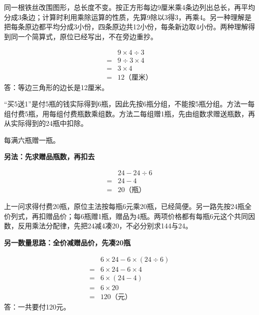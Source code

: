 \documentclass[multi=snippet,border=0pt]{standalone}
\newenvironment{snippet}[3]{\begin{minipage}{#1bp}\color{answerred}\fontsize{#2}{#3}\selectfont\raggedright}{\end{minipage}}
\begin{document}
\begin{snippet}{505}{11.5}{14}同一根铁丝改围图形，总长度不变。按正方形每边9厘米乘4条边列出总长，再平均分成3条边；计算时利用乘除运算的性质，先算9除以3得3，再乘4。另一种理解是把每条原边都平均分成3小份，四条原边共12小份，每条新边取4小份。两种理解得到同一个简算式，原位已经写出，不在旁边重抄。\end{snippet}
\begin{snippet}{359}{10.5}{12.8}\[\begin{aligned}&9\times4\div3\\={}&9\div3\times4\\={}&3\times4\\={}&12\text{（厘米）}\end{aligned}\]答：等边三角形的边长是12厘米。\end{snippet}
\begin{snippet}{505}{11.5}{14}“买5送1”是付5瓶的钱实际得到6瓶，因此先按6瓶分组，不能按5瓶分组。方法一每组付费5瓶，用每组付费瓶数乘组数。方法二每组赠1瓶，先由组数求赠送瓶数，再从实际得到的24瓶中扣除。\par 每满六瓶赠一瓶。\par \textbf{另法：先求赠品瓶数，再扣去}\par \[\begin{aligned}&24-24\div6\\={}&24-4\\={}&20\text{（瓶）}\end{aligned}\]\end{snippet}
\begin{snippet}{505}{11.5}{14}上一问求得付费20瓶，原位主法按每瓶6元乘20瓶，已经简便。另一路先按24瓶全价列式，再扣赠品价；每6瓶赠1瓶，赠品为4瓶。两项价格都有每瓶6元这个共同因数，反用乘法分配律，先把24减4凑20，不必分别求144与24。\par \textbf{另一数量思路：全价减赠品价，先凑20瓶}\par \[\begin{aligned}&6\times24-6\times(24\div6)\\={}&6\times24-6\times4\\={}&6\times(24-4)\\={}&6\times20\\={}&120\text{（元）}\end{aligned}\]答：一共要付120元。\end{snippet}
\end{document}
